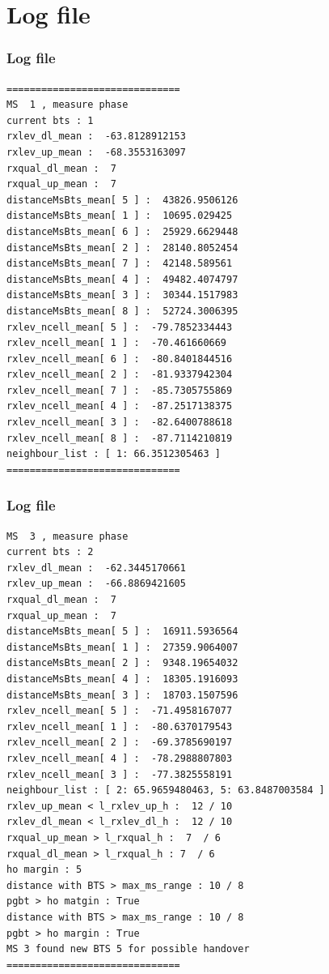 \documentclass{beamer}
\begin{document}
\section{Log file}

\begin{frame}[fragile]
\frametitle{Log file}

{\tiny
\begin{verbatim}
==============================
MS  1 , measure phase
current bts : 1
rxlev_dl_mean :  -63.8128912153
rxlev_up_mean :  -68.3553163097
rxqual_dl_mean :  7
rxqual_up_mean :  7
distanceMsBts_mean[ 5 ] :  43826.9506126
distanceMsBts_mean[ 1 ] :  10695.029425
distanceMsBts_mean[ 6 ] :  25929.6629448
distanceMsBts_mean[ 2 ] :  28140.8052454
distanceMsBts_mean[ 7 ] :  42148.589561
distanceMsBts_mean[ 4 ] :  49482.4074797
distanceMsBts_mean[ 3 ] :  30344.1517983
distanceMsBts_mean[ 8 ] :  52724.3006395
rxlev_ncell_mean[ 5 ] :  -79.7852334443
rxlev_ncell_mean[ 1 ] :  -70.461660669
rxlev_ncell_mean[ 6 ] :  -80.8401844516
rxlev_ncell_mean[ 2 ] :  -81.9337942304
rxlev_ncell_mean[ 7 ] :  -85.7305755869
rxlev_ncell_mean[ 4 ] :  -87.2517138375
rxlev_ncell_mean[ 3 ] :  -82.6400788618
rxlev_ncell_mean[ 8 ] :  -87.7114210819
neighbour_list : [ 1: 66.3512305463 ]
==============================
\end{verbatim}
}

\end{frame}

\begin{frame}[fragile]
\frametitle{Log file}

{\tiny
\begin{verbatim}
MS  3 , measure phase
current bts : 2
rxlev_dl_mean :  -62.3445170661
rxlev_up_mean :  -66.8869421605
rxqual_dl_mean :  7
rxqual_up_mean :  7
distanceMsBts_mean[ 5 ] :  16911.5936564
distanceMsBts_mean[ 1 ] :  27359.9064007
distanceMsBts_mean[ 2 ] :  9348.19654032
distanceMsBts_mean[ 4 ] :  18305.1916093
distanceMsBts_mean[ 3 ] :  18703.1507596
rxlev_ncell_mean[ 5 ] :  -71.4958167077
rxlev_ncell_mean[ 1 ] :  -80.6370179543
rxlev_ncell_mean[ 2 ] :  -69.3785690197
rxlev_ncell_mean[ 4 ] :  -78.2988807803
rxlev_ncell_mean[ 3 ] :  -77.3825558191
neighbour_list : [ 2: 65.9659480463, 5: 63.8487003584 ]
rxlev_up_mean < l_rxlev_up_h :  12 / 10
rxlev_dl_mean < l_rxlev_dl_h :  12 / 10
rxqual_up_mean > l_rxqual_h :  7  / 6
rxqual_dl_mean > l_rxqual_h : 7  / 6
ho margin : 5
distance with BTS > max_ms_range : 10 / 8
pgbt > ho matgin : True
distance with BTS > max_ms_range : 10 / 8
pgbt > ho margin : True
MS 3 found new BTS 5 for possible handover
==============================
\end{verbatim}
}
\end{frame}
\end{document}
